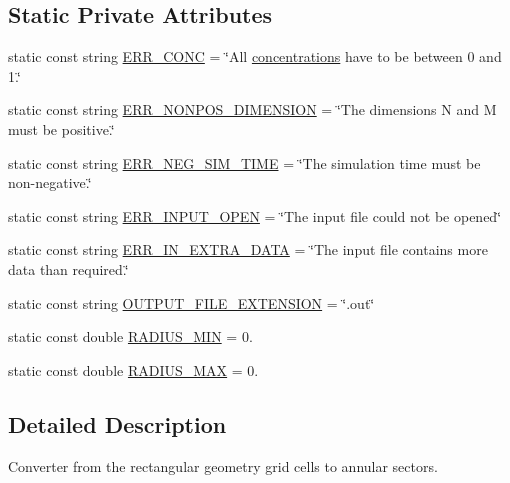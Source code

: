 \subsection*{Static Private Attributes}
\begin{DoxyCompactItemize}
\item 
static const string \hyperlink{classmultiscale_1_1video_1_1CartesianToPolarConverter_a2657e7972c2d3f7cc4c0011ccd8423e4}{E\-R\-R\-\_\-\-C\-O\-N\-C} = \char`\"{}All \hyperlink{classmultiscale_1_1video_1_1CartesianToPolarConverter_a7356e201623f518132d75b7bc48407d3}{concentrations} have to be between 0 and 1.\char`\"{}
\item 
static const string \hyperlink{classmultiscale_1_1video_1_1CartesianToPolarConverter_ab3a2114f4dd2615abba3305609f1b616}{E\-R\-R\-\_\-\-N\-O\-N\-P\-O\-S\-\_\-\-D\-I\-M\-E\-N\-S\-I\-O\-N} = \char`\"{}The dimensions N and M must be positive.\char`\"{}
\item 
static const string \hyperlink{classmultiscale_1_1video_1_1CartesianToPolarConverter_a0a3ab913d167193883dc96aed6cc8290}{E\-R\-R\-\_\-\-N\-E\-G\-\_\-\-S\-I\-M\-\_\-\-T\-I\-M\-E} = \char`\"{}The simulation time must be non-\/negative.\char`\"{}
\item 
static const string \hyperlink{classmultiscale_1_1video_1_1CartesianToPolarConverter_a298f7aba7ec17e486484fa2e52ebc109}{E\-R\-R\-\_\-\-I\-N\-P\-U\-T\-\_\-\-O\-P\-E\-N} = \char`\"{}The input file could not be opened\char`\"{}
\item 
static const string \hyperlink{classmultiscale_1_1video_1_1CartesianToPolarConverter_a27c4664c63c53cc5351bbb3233bdfce1}{E\-R\-R\-\_\-\-I\-N\-\_\-\-E\-X\-T\-R\-A\-\_\-\-D\-A\-T\-A} = \char`\"{}The input file contains more data than required.\char`\"{}
\item 
static const string \hyperlink{classmultiscale_1_1video_1_1CartesianToPolarConverter_a3dcad19e1da427627d783a3053174372}{O\-U\-T\-P\-U\-T\-\_\-\-F\-I\-L\-E\-\_\-\-E\-X\-T\-E\-N\-S\-I\-O\-N} = \char`\"{}.out\char`\"{}
\item 
static const double \hyperlink{classmultiscale_1_1video_1_1CartesianToPolarConverter_a59c18c22603ad65bf26533dd2aafd04e}{R\-A\-D\-I\-U\-S\-\_\-\-M\-I\-N} = 0.
\item 
static const double \hyperlink{classmultiscale_1_1video_1_1CartesianToPolarConverter_a79bb03defe0d68884ce5d4f1b0a7d60c}{R\-A\-D\-I\-U\-S\-\_\-\-M\-A\-X} = 0.
\end{DoxyCompactItemize}


\subsection{Detailed Description}
Converter from the rectangular geometry grid cells to annular sectors. 

